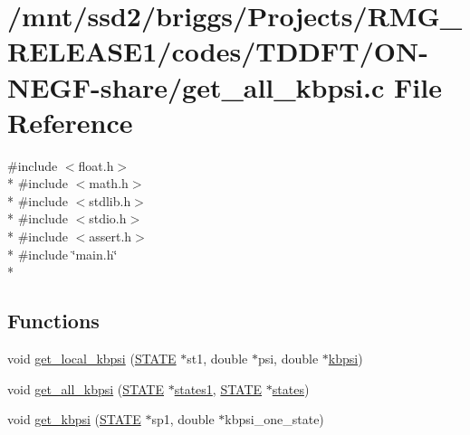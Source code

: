 \hypertarget{_t_d_d_f_t_2_o_n-_n_e_g_f-share_2get__all__kbpsi_8c}{\section{/mnt/ssd2/briggs/\-Projects/\-R\-M\-G\-\_\-\-R\-E\-L\-E\-A\-S\-E1/codes/\-T\-D\-D\-F\-T/\-O\-N-\/\-N\-E\-G\-F-\/share/get\-\_\-all\-\_\-kbpsi.c File Reference}
\label{_t_d_d_f_t_2_o_n-_n_e_g_f-share_2get__all__kbpsi_8c}
}
{\ttfamily \#include $<$float.\-h$>$}\\*
{\ttfamily \#include $<$math.\-h$>$}\\*
{\ttfamily \#include $<$stdlib.\-h$>$}\\*
{\ttfamily \#include $<$stdio.\-h$>$}\\*
{\ttfamily \#include $<$assert.\-h$>$}\\*
{\ttfamily \#include \char`\"{}main.\-h\char`\"{}}\\*
\subsection*{Functions}
\begin{DoxyCompactItemize}
\item 
void \hyperlink{_t_d_d_f_t_2_o_n-_n_e_g_f-share_2get__all__kbpsi_8c_a26cb2f9aebc6356d7b05821cadbbc52a}{get\-\_\-local\-\_\-kbpsi} (\hyperlink{struct_s_t_a_t_e}{S\-T\-A\-T\-E} $\ast$st1, double $\ast$psi, double $\ast$\hyperlink{overlap_8h_aa5c5ccb14e2d6e1303536c0d5b8f10e6}{kbpsi})
\item 
void \hyperlink{_t_d_d_f_t_2_o_n-_n_e_g_f-share_2get__all__kbpsi_8c_a1bfa18beadeceac6a36265a8168f477b}{get\-\_\-all\-\_\-kbpsi} (\hyperlink{struct_s_t_a_t_e}{S\-T\-A\-T\-E} $\ast$\hyperlink{md_8h_a10867c0650687df1688d9455980e10a9}{states1}, \hyperlink{struct_s_t_a_t_e}{S\-T\-A\-T\-E} $\ast$\hyperlink{md_8h_a286ebf6b996d2b1827eb9a889dfc83d7}{states})
\item 
void \hyperlink{_t_d_d_f_t_2_o_n-_n_e_g_f-share_2get__all__kbpsi_8c_a482ebce0dce5042a470931ed884f154f}{get\-\_\-kbpsi} (\hyperlink{struct_s_t_a_t_e}{S\-T\-A\-T\-E} $\ast$sp1, double $\ast$kbpsi\-\_\-one\-\_\-state)
\end{DoxyCompactItemize}


